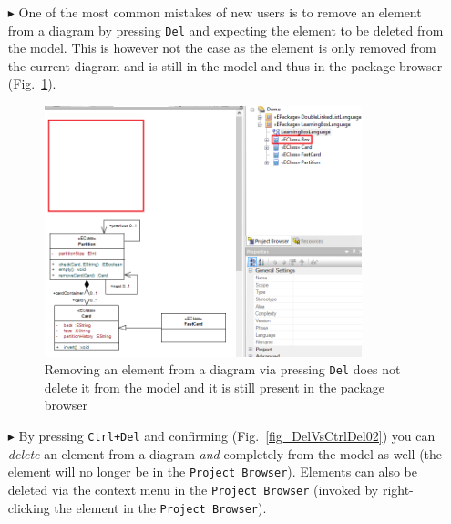 \begin{enumerate}
\item[$\blacktriangleright$] One of the most common mistakes of new users is to remove an element from a diagram by pressing \texttt{Del} and expecting the element to be deleted from the model.   
This is however not the case as the element is only removed from the current diagram and is still in the model and thus in the package browser (Fig.~\ref{fig_DelVsCtrlDel01}).

\begin{figure}[htbp]
\begin{center} 
\includegraphics[width=0.87\textwidth]{pics/tricks/DelVsCtrlDel/DelVsCtrlDel1}
  \caption{Removing an element from a diagram via pressing \texttt{Del} does not delete it from the model and it is still present in the package browser}  
    \label{fig_DelVsCtrlDel01}
\end{center}
\end{figure}  

\item[$\blacktriangleright$] By pressing \texttt{Ctrl+Del} and confirming (Fig.~\ref{fig_DelVsCtrlDel02}) you can \emph{delete} an element from a diagram \emph{and} completely from the model as well (the element will no longer be in the \texttt{Project Browser}).
Elements can also be deleted via the context menu in the \texttt{Project Browser} (invoked by right-clicking the element in the \texttt{Project Browser}).


\end{enumerate}

